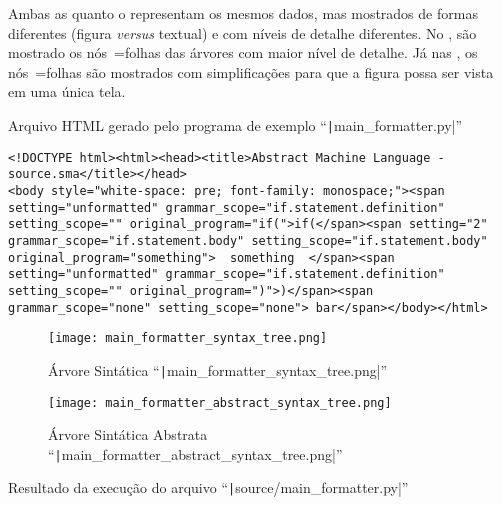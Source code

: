 Ambas as  quanto o  representam os mesmos dados,
mas mostrados de formas diferentes (figura \textit{versus} textual) e
com níveis de detalhe diferentes.
No ,
são mostrado os nós~=folhas das árvores com maior nível de detalhe.
Já nas ,
os nós~=folhas são mostrados com simplificações para que a figura possa ser vista em uma única tela.
\begin{code}
\caption[Arquivo HTML gerado pelo programa de exemplo ``main\_formatter.py'']{Arquivo HTML gerado pelo programa de exemplo ``\texttt|main_formatter.py|''}
\label{code:MainFormatterHtml}
\begin{verbatim}
<!DOCTYPE html><html><head><title>Abstract Machine Language - source.sma</title></head>
<body style="white-space: pre; font-family: monospace;"><span setting="unformatted" grammar_scope="if.statement.definition" setting_scope="" original_program="if(">if(</span><span setting="2" grammar_scope="if.statement.body" setting_scope="if.statement.body" original_program="something">  something  </span><span setting="unformatted" grammar_scope="if.statement.definition" setting_scope="" original_program=")">)</span><span grammar_scope="none" setting_scope="none"> bar</span></body></html>
\end{verbatim}
\end{code}

\begin{figure}[!htb]
\caption[Árvore Sintática ``main\_formatter\_syntax\_tree.png'']{Árvore Sintática ``\texttt|main_formatter_syntax_tree.png|''}
\label{figure:MainFormatterSyntaxTree}
\centering
\texttt{[image: main\_formatter\_syntax\_tree.png]}
\end{figure}

\begin{figure}[!htb]
\caption[Árvore Sintática Abstrata ``main\_formatter\_abstract\_syntax\_tree.png'']{Árvore Sintática Abstrata ``\texttt|main_formatter_abstract_syntax_tree.png|''}
\label{figure:MainFormatterAbstractSyntaxTree}
\centering
\texttt{[image: main\_formatter\_abstract\_syntax\_tree.png]}
\end{figure}

\begin{code}
\caption[Resultado da execução do arquivo ``source/main\_formatter.py'']{Resultado da execução do arquivo ``\texttt|source/main_formatter.py|''}
\label{code:MainFormatterPyResult}
\inputminted{text}{aftertext/main_formatter_output.txt}
\end{code}


